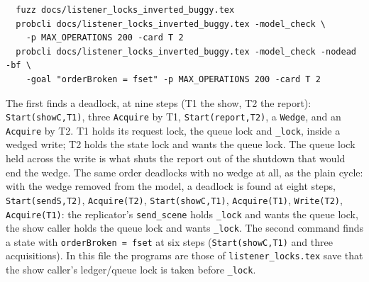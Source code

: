 \documentclass[a4paper,10pt,fleqn]{article}
\begin{document}
\begin{verbatim}
  fuzz docs/listener_locks_inverted_buggy.tex
  probcli docs/listener_locks_inverted_buggy.tex -model_check \
    -p MAX_OPERATIONS 200 -card T 2
  probcli docs/listener_locks_inverted_buggy.tex -model_check -nodead -bf \
    -goal "orderBroken = fset" -p MAX_OPERATIONS 200 -card T 2
\end{verbatim}

The first finds a deadlock, at nine steps (T1 the show, T2 the report):
\texttt{Start(showC,T1)}, three \texttt{Acquire} by T1, \texttt{Start(report,T2)},
a \texttt{Wedge}, and an \texttt{Acquire} by T2.  T1 holds its request lock, the
queue lock and \texttt{\_lock}, inside a wedged write; T2 holds the state lock
and wants the queue lock.  The queue
lock held across the write is what shuts the report out of the shutdown that
would end the wedge.  The same order deadlocks with no wedge at all, as the
plain cycle: with the wedge removed from the model, a deadlock is found at
eight steps, \texttt{Start(sendS,T2)}, \texttt{Acquire(T2)},
\texttt{Start(showC,T1)}, \texttt{Acquire(T1)}, \texttt{Write(T2)},
\texttt{Acquire(T1)}: the replicator's \texttt{send\_scene} holds
\texttt{\_lock} and wants the queue lock, the show caller holds the queue lock
and wants \texttt{\_lock}.  The second command finds a state with
\texttt{orderBroken = fset} at six steps (\texttt{Start(showC,T1)} and three
acquisitions).  In this file the
programs are those of \texttt{listener\_locks.tex} save that the show caller's
ledger/queue lock is taken before \texttt{\_lock}.
\end{document}
